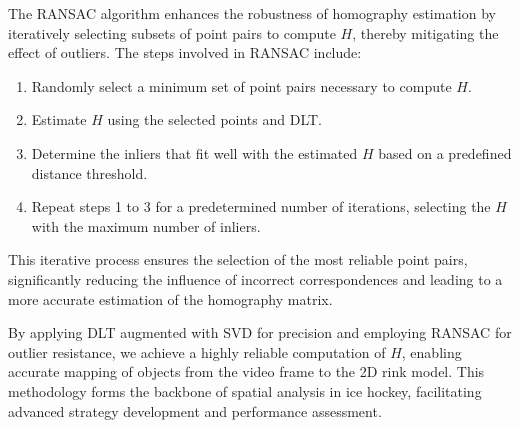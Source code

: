 \documentclass[12pt, letterpaper]{article}
\begin{document}
{\begin{spacing}{1.2}
The RANSAC algorithm enhances the robustness of homography estimation by iteratively selecting subsets of point pairs to compute \(H\), thereby mitigating the effect of outliers. The steps involved in RANSAC include:

\begin{enumerate}
    \item Randomly select a minimum set of point pairs necessary to compute \(H\).
    \item Estimate \(H\) using the selected points and DLT.
    \item Determine the inliers that fit well with the estimated \(H\) based on a predefined distance threshold.
    \item Repeat steps 1 to 3 for a predetermined number of iterations, selecting the \(H\) with the maximum number of inliers.
\end{enumerate}

This iterative process ensures the selection of the most reliable point pairs, significantly reducing the influence of incorrect correspondences and leading to a more accurate estimation of the homography matrix.

By applying DLT augmented with SVD for precision and employing RANSAC for outlier resistance, we achieve a highly reliable computation of \(H\), enabling accurate mapping of objects from the video frame to the 2D rink model. This methodology forms the backbone of spatial analysis in ice hockey, facilitating advanced strategy development and performance assessment.



\end{spacing}
}
\end{document}
